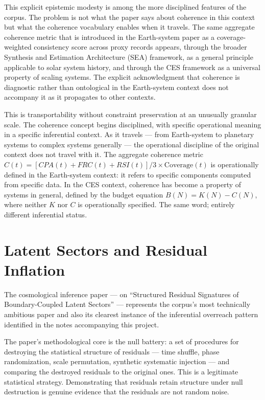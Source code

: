 \documentclass[12pt, openright, twoside]{book}
\begin{document}
This explicit epistemic modesty is among the more disciplined features of the
corpus. The problem is not what the paper says about coherence in this context
but what the coherence vocabulary enables when it travels. The same aggregate
coherence metric that is introduced in the Earth-system paper as a coverage-weighted
consistency score across proxy records appears, through the broader Synthesis
and Estimation Architecture (SEA) framework, as a general principle applicable
to solar system history, and through the CES framework as a universal property
of scaling systems. The explicit acknowledgment that coherence is diagnostic
rather than ontological in the Earth-system context does not accompany it
as it propagates to other contexts.

This is transportability without constraint preservation at an unusually granular
scale. The coherence concept begins disciplined, with specific operational meaning
in a specific inferential context. As it travels --- from Earth-system to
planetary systems to complex systems generally --- the operational discipline
of the original context does not travel with it. The aggregate coherence metric
$C(t) = [CPA(t) + FRC(t) + RSI(t)]/3 \times \text{Coverage}(t)$ is operationally
defined in the Earth-system context: it refers to specific components computed
from specific data. In the CES context, coherence has become a property of
systems in general, defined by the budget equation $B(N) = K(N) - C(N)$, where
neither $K$ nor $C$ is operationally specified. The same word; entirely different
inferential status.

\section{Latent Sectors and Residual Inflation}

The cosmological inference paper --- on ``Structured Residual Signatures of
Boundary-Coupled Latent Sectors'' --- represents the corpus's most technically
ambitious paper and also its clearest instance of the inferential overreach
pattern identified in the notes accompanying this project.

The paper's methodological core is the null battery: a set of procedures for
destroying the statistical structure of residuals --- time shuffle, phase
randomization, scale permutation, synthetic systematic injection --- and
comparing the destroyed residuals to the original ones. This is a legitimate
statistical strategy. Demonstrating that residuals retain structure under
null destruction is genuine evidence that the residuals are not random noise.
\end{document}

